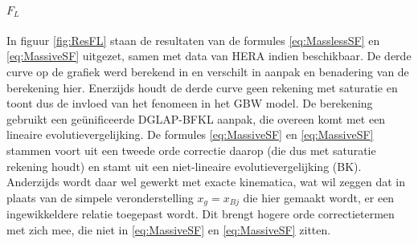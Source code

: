 \documentclass[a4paper,11pt]{article}
\numberwithin{equation}{section} %
\begin{document}
      \paragraph{$F_L$}
In figuur \ref{fig:ResFL} staan de resultaten van de formules \eqref{eq:MasslessSF} en \eqref{eq:MassiveSF} uitgezet, samen met data van HERA \cite{H1} \cite{ZEUS} indien beschikbaar.
De derde curve op de grafiek werd berekend in \cite{Stasto} en verschilt in aanpak en benadering van de berekening hier.
Enerzijds houdt de derde curve geen rekening met saturatie en toont dus de invloed van het fenomeen in het GBW model.
De berekening gebruikt een geünificeerde DGLAP-BFKL aanpak, die overeen komt met een lineaire evolutievergelijking.
De formules \eqref{eq:MassiveSF} en \eqref{eq:MassiveSF} stammen voort uit een tweede orde correctie daarop (die dus met saturatie rekening houdt) en stamt uit een niet-lineaire evolutievergelijking (BK).
Anderzijds wordt daar wel gewerkt met exacte kinematica, wat wil zeggen dat in plaats van de simpele veronderstelling $x_g=x_{Bj}$ die hier gemaakt wordt, er een ingewikkeldere relatie toegepast wordt.
Dit brengt hogere orde correctietermen met zich mee, die niet in \eqref{eq:MassiveSF} en \eqref{eq:MassiveSF} zitten.
\end{document}
